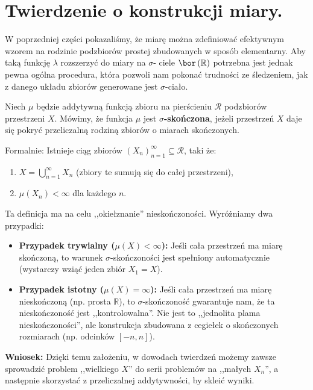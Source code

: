 \section{Twierdzenie o konstrukcji miary.}

\noindent W poprzedniej części pokazaliśmy, że miarę można zdefiniować efektywnym wzorem na rodzinie podzbiorów prostej zbudowanych w sposób elementarny. Aby taką funkcję $\lambda$ rozszerzyć do miary na $\sigma $- ciele $\bor\left(\mathbb{R}\right) $ potrzebna jest jednak pewna ogólna procedura, która pozwoli nam pokonać trudności ze śledzeniem, jak z danego układu zbiorów generowane jest $\sigma $-ciało.

\begin{definition}
    Niech $\mu$ będzie addytywną funkcją zbioru na pierścieniu $\mathcal{R}$ podzbiorów przestrzeni $X$.
    Mówimy, że funkcja $\mu$ jest \textbf{$\sigma$-skończona}, jeżeli przestrzeń $X$ daje się pokryć przeliczalną rodziną zbiorów o miarach skończonych.
    
    Formalnie: Istnieje ciąg zbiorów $(X_n)_{n=1}^{\infty} \subseteq \mathcal{R}$, taki że:
    \begin{enumerate}
        \item $X = \bigcup_{n=1}^{\infty} X_n$ \quad (zbiory te sumują się do całej przestrzeni),
        \item $\mu(X_n) < \infty$ dla każdego $n$.
    \end{enumerate}
\end{definition}

\begin{remark}
    Ta definicja ma na celu ,,okiełznanie'' nieskończoności. Wyróżniamy dwa przypadki:
    \begin{itemize}
        \item \textbf{Przypadek trywialny ($\mu(X) < \infty$):} Jeśli cała przestrzeń ma miarę skończoną, to warunek $\sigma$-skończoności jest spełniony automatycznie (wystarczy wziąć jeden zbiór $X_1 = X$).
        \item \textbf{Przypadek istotny ($\mu(X) = \infty$):} Jeśli cała przestrzeń ma miarę nieskończoną (np. prosta $\mathbb{R}$), to $\sigma$-skończoność gwarantuje nam, że ta nieskończoność jest ,,kontrolowalna''. Nie jest to ,,jednolita plama nieskończoności'', ale konstrukcja zbudowana z cegiełek o skończonych rozmiarach (np. odcinków $[-n, n]$).
    \end{itemize}
    \textbf{Wniosek:} Dzięki temu założeniu, w dowodach twierdzeń możemy zawsze sprowadzić problem ,,wielkiego $X$'' do serii problemów na ,,małych $X_n$'', a następnie skorzystać z przeliczalnej addytywności, by skleić wyniki.
\end{remark}


